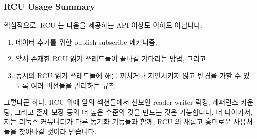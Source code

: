 \subsubsection{RCU Usage Summary}
\label{sec:defer:RCU Usage Summary}

핵심적으로, RCU 는 다음을 제공하는 API 이상도 이하도
아닙니다:

\begin{enumerate}
\item	데이터 추가를 위한 publish-subscribe 메커니즘,
\item	앞서 존재한 RCU 읽기 쓰레드들이 끝나길 기다리는 방법, 그리고
\item	동시의 RCU 읽기 쓰레드들에 해를 끼치거나 지연시키지 않고 변경을 가할 수
	있도록 여러 버전들을 관리하는 규칙.
\end{enumerate}

그렇다곤 하나, RCU 위에 앞의 섹션들에서 선보인 reader-writer 락킹, 레퍼런스
카운팅, 그리고 존재 보장 등의 더 높은 수준의 것을 만드는 것은 가능합니다.
더 나아가서, 저는 리눅스 커뮤니티가 다른 동기화 기능들과 함께, RCU 의 새롭고
흥미로운 사용처들을 찾아나갈 것이라 믿습니다.

